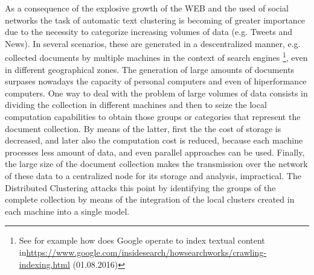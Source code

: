 \documentclass[10pt]{article}
\begin{document}
As a consequence of the explosive growth of the WEB and the used of social networks the task of automatic text clustering is becoming of greater importance due to the necessity to categorize increasing volumes of data (e.g. Tweets and News). In several scenarios, these are generated in a descentralized manner, e.g. collected documents by multiple machines in the context of search engines \footnote{See for example how does Google operate to index textual content in\url{https://www.google.com/insidesearch/howsearchworks/crawling-indexing.html} (01.08.2016)}, even in different geographical zones. The generation of large amounts of documents surpases nowadays the capacity of personal computers and even of hiperformance computers. One way to deal with the problem of large volumes of data consists in dividing the collection in different machines and then to seize the local computation capabilities to obtain those groups or categories that represent the document collection. By means of the latter, first the the cost of storage is decreased, and later also the computation cost is reduced, because each machine processes less amount of data, and even parallel approaches can be used. Finally, the large size of the document collection makes the transmission over the network of these data  to a centralized node for its storage and analysis, impractical. The Distributed Clustering attacks this point by identifying the groups of the complete collection by means of the integration of the local clusters created in each machine into a single model.

\end{document}
